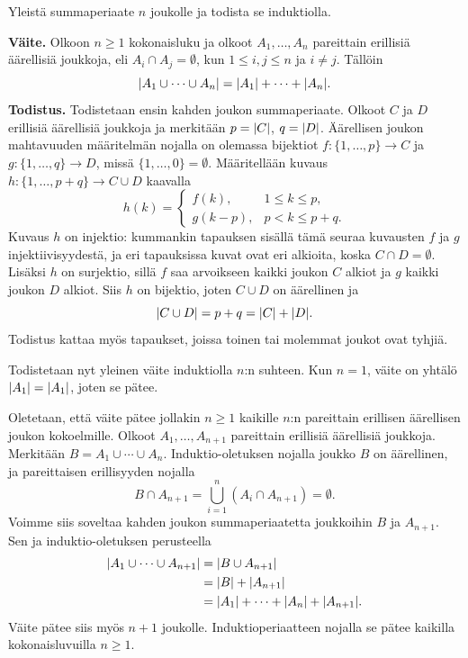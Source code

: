 \documentclass[11pt,a4paper]{amsart}
\begin{document}
\begin{exercise}
Yleistä summaperiaate \(n\) joukolle ja todista se induktiolla.
\end{exercise}

\begin{solution}
\textbf{Väite.} Olkoon \(n \geq 1\) kokonaisluku ja olkoot
\(A_1, \ldots, A_n\) pareittain erillisiä äärellisiä joukkoja, eli
\(A_i \cap A_j = \emptyset\), kun \(1 \leq i,j \leq n\) ja \(i \neq j\).
Tällöin
\[
\lvert A_1 \cup \cdots \cup A_n\rvert = \lvert A_1\rvert + \cdots + \lvert A_n\rvert.
\]
\textbf{Todistus.} Todistetaan ensin kahden joukon summaperiaate.
Olkoot \(C\) ja \(D\) erillisiä äärellisiä joukkoja ja merkitään
\(p = \lvert C\rvert\), \(q = \lvert D\rvert\). Äärellisen joukon mahtavuuden
määritelmän nojalla on olemassa bijektiot
\(f\colon \{1,\ldots,p\} \to C\) ja
\(g\colon \{1,\ldots,q\} \to D\), missä
\(\{1,\ldots,0\} = \emptyset\). Määritellään kuvaus
\(h\colon \{1,\ldots,p+q\} \to C\cup D\) kaavalla
\[
h(k) =
\begin{cases}
  f(k), & 1 \leq k \leq p, \\
  g(k-p), & p < k \leq p+q.
\end{cases}
\]
Kuvaus \(h\) on injektio: kummankin tapauksen sisällä tämä seuraa
kuvausten \(f\) ja \(g\) injektiivisyydestä, ja eri tapauksissa
kuvat ovat eri alkioita, koska \(C\cap D = \emptyset\).
Lisäksi \(h\) on surjektio, sillä \(f\) saa arvoikseen kaikki
joukon \(C\) alkiot ja \(g\) kaikki joukon \(D\) alkiot.
Siis \(h\) on bijektio, joten \(C\cup D\) on äärellinen ja
\[
\lvert C\cup D\rvert = p+q = \lvert C\rvert+\lvert D\rvert.
\]
Todistus kattaa myös tapaukset, joissa toinen tai molemmat joukot
ovat tyhjiä.

Todistetaan nyt yleinen väite induktiolla \(n\):n suhteen.
Kun \(n = 1\), väite on yhtälö \(\lvert A_1\rvert = \lvert A_1\rvert\), joten se pätee.

Oletetaan, että väite pätee jollakin \(n \geq 1\) kaikille \(n\):n
pareittain erillisen äärellisen joukon kokoelmille. Olkoot
\(A_1, \ldots, A_{n+1}\) pareittain erillisiä äärellisiä joukkoja.
Merkitään \(B = A_1 \cup \cdots \cup A_n\). Induktio-oletuksen nojalla
joukko \(B\) on äärellinen,
ja pareittaisen erillisyyden nojalla
\[
B \cap A_{n+1}
= \bigcup_{i=1}^{n}(A_i \cap A_{n+1})
= \emptyset.
\]
Voimme siis soveltaa kahden joukon summaperiaatetta joukkoihin
\(B\) ja \(A_{n+1}\). Sen ja induktio-oletuksen perusteella
\[
\begin{aligned}
  \lvert A_1 \cup \cdots \cup A_{n+1}\rvert
  &= \lvert B \cup A_{n+1}\rvert \\
  &= \lvert B\rvert + \lvert A_{n+1}\rvert \\
  &= \lvert A_1\rvert + \cdots + \lvert A_n\rvert + \lvert A_{n+1}\rvert.
\end{aligned}
\]
Väite pätee siis myös \(n+1\) joukolle. Induktioperiaatteen nojalla
se pätee kaikilla kokonaisluvuilla \(n \geq 1\).
\end{solution}
\end{document}
